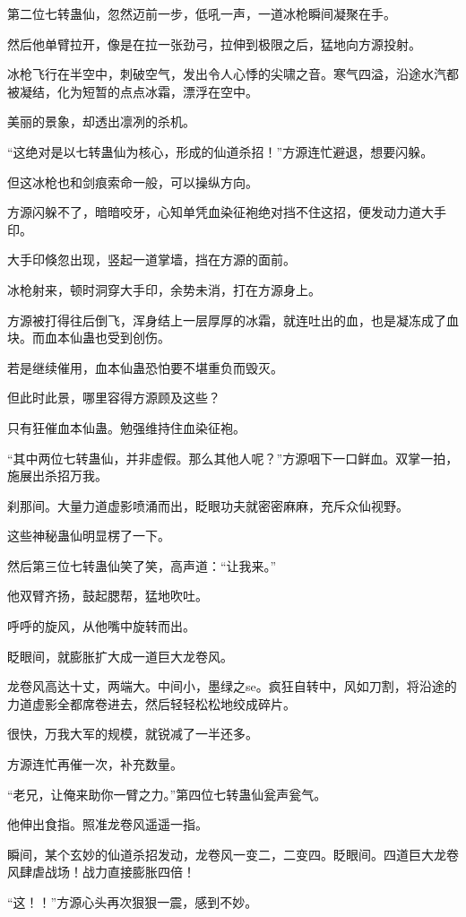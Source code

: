 \begin{this_body}
第二位七转蛊仙，忽然迈前一步，低吼一声，一道冰枪瞬间凝聚在手。

然后他单臂拉开，像是在拉一张劲弓，拉伸到极限之后，猛地向方源投射。

冰枪飞行在半空中，刺破空气，发出令人心悸的尖啸之音。寒气四溢，沿途水汽都被凝结，化为短暂的点点冰霜，漂浮在空中。

美丽的景象，却透出凛冽的杀机。

“这绝对是以七转蛊仙为核心，形成的仙道杀招！”方源连忙避退，想要闪躲。

但这冰枪也和剑痕索命一般，可以操纵方向。

方源闪躲不了，暗暗咬牙，心知单凭血染征袍绝对挡不住这招，便发动力道大手印。

大手印倏忽出现，竖起一道掌墙，挡在方源的面前。

冰枪射来，顿时洞穿大手印，余势未消，打在方源身上。

方源被打得往后倒飞，浑身结上一层厚厚的冰霜，就连吐出的血，也是凝冻成了血块。而血本仙蛊也受到创伤。

若是继续催用，血本仙蛊恐怕要不堪重负而毁灭。

但此时此景，哪里容得方源顾及这些？

只有狂催血本仙蛊。勉强维持住血染征袍。

“其中两位七转蛊仙，并非虚假。那么其他人呢？”方源咽下一口鲜血。双掌一拍，施展出杀招万我。

刹那间。大量力道虚影喷涌而出，眨眼功夫就密密麻麻，充斥众仙视野。

这些神秘蛊仙明显楞了一下。

然后第三位七转蛊仙笑了笑，高声道：“让我来。”

他双臂齐扬，鼓起腮帮，猛地吹吐。

呼呼的旋风，从他嘴中旋转而出。

眨眼间，就膨胀扩大成一道巨大龙卷风。

龙卷风高达十丈，两端大。中间小，墨绿之se。疯狂自转中，风如刀割，将沿途的力道虚影全都席卷进去，然后轻轻松松地绞成碎片。

很快，万我大军的规模，就锐减了一半还多。

方源连忙再催一次，补充数量。

“老兄，让俺来助你一臂之力。”第四位七转蛊仙瓮声瓮气。

他伸出食指。照准龙卷风遥遥一指。

瞬间，某个玄妙的仙道杀招发动，龙卷风一变二，二变四。眨眼间。四道巨大龙卷风肆虐战场！战力直接膨胀四倍！

“这！！”方源心头再次狠狠一震，感到不妙。


\end{this_body}

